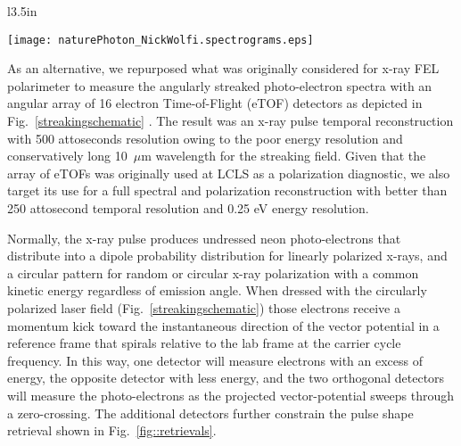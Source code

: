 \begin{wrapfigure}[22]{l}{3.5in}
\vspace{-0.5\baselineskip}
\centerline{\texttt{[image: naturePhoton\_NickWolfi.spectrograms.eps]}}
\vspace{-0.5\baselineskip}
\caption{\label{fig::retrievals}X-ray pulse shape retrievals reproduced from Ref.~\cite{Nick2018}.}
\end{wrapfigure}
As an alternative, we repurposed what was originally considered for x-ray FEL polarimeter \cite{Markus2014,Allaria2014,Mazza2014,Lutman2016} to measure the angularly streaked photo-electron spectra with an angular array of 16 electron Time-of-Flight (eTOF) detectors as depicted in Fig.~\ref{streakingschematic} \cite{Nick2018}.
The result was an x-ray pulse temporal reconstruction with 500 attoseconds resolution owing to the poor energy resolution and conservatively long 10~$\mu$m wavelength for the streaking field. 
Given that the array of eTOFs was originally used at LCLS as a polarization diagnostic, we also target its use for a full spectral and polarization reconstruction with better than 250 attosecond temporal resolution and 0.25 eV energy resolution.

Normally, the x-ray pulse produces undressed neon photo-electrons that distribute into a dipole probability distribution for linearly polarized x-rays, and a circular pattern for random or circular x-ray polarization with a common kinetic energy regardless of emission angle.
When dressed with the circularly polarized laser field (Fig.~\ref{streakingschematic}) those electrons receive a momentum kick toward the instantaneous direction of the vector potential in a reference frame that spirals relative to the lab frame at the carrier cycle frequency.
In this way, one detector will measure electrons with an excess of energy, the opposite detector with less energy, and the two orthogonal detectors will measure the photo-electrons as the projected vector-potential sweeps through a zero-crossing.
The additional detectors further constrain the pulse shape retrieval shown in Fig.~\ref{fig::retrievals}.


